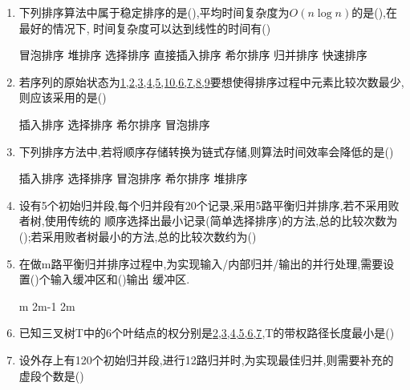 \documentclass[12pt, a4paper, oneside, UTF8]{ctexbook}
\begin{document}
\begin{enumerate}
    \item 下列排序算法中属于稳定排序的是(),平均时间复杂度为$O(n\log{n})$的是(),在最好的情况下,
    时间复杂度可以达到线性的时间有() 
    \begin{choices}[4]
        \task 冒泡排序
        \task 堆排序
        \task 选择排序 
        \task 直接插入排序 
        \task 希尔排序 
        \task 归并排序 
        \task 快速排序
    \end{choices}

    \item 若序列的原始状态为\underline{1,2,3,4,5,10,6,7,8,9}要想使得排序过程中元素比较次数最少,则应该采用的是()
    \begin{choices}
        \task 插入排序 
        \task 选择排序 
        \task 希尔排序 
        \task 冒泡排序 
    \end{choices}
    
    \item \bl 下列排序方法中,若将顺序存储转换为链式存储,则算法时间效率会降低的是() 
    \begin{choices}[3]
        \task 插入排序 
        \task 选择排序
        \task 冒泡排序
        \task 希尔排序 
        \task 堆排序 
    \end{choices}
    
    \item 设有5个初始归并段,每个归并段有20个记录,采用5路平衡归并排序,若不采用败者树,使用传统的
    顺序选择出最小记录(简单选择排序)的方法,总的比较次数为();若采用败者树最小的方法,总的比较次数约为() 
    \begin{choices}
    \end{choices}


    \item 在做m路平衡归并排序过程中,为实现输入/内部归并/输出的并行处理,需要设置()个输入缓冲区和()输出
    缓冲区. 
    \begin{choices}
        \task m
        \task 2m-1
        \task 2m
    \end{choices}

    \item \bl 已知三叉树T中的6个叶结点的权分别是\underline{2,3,4,5,6,7},T的带权路径长度最小是() 
    \begin{choices}
    \end{choices}

    \item \bl 设外存上有120个初始归并段,进行12路归并时,为实现最佳归并,则需要补充的虚段个数是() 
    \begin{choices}
    \end{choices}
\end{enumerate}
\end{document}
